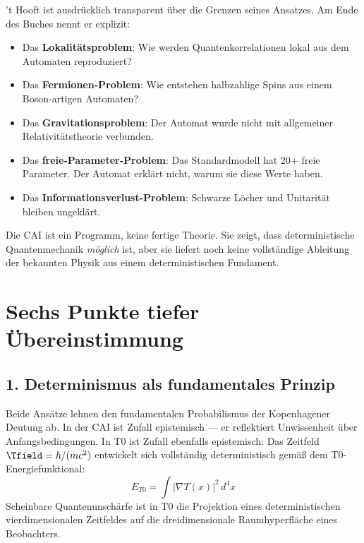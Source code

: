 't Hooft ist ausdrücklich transparent über die Grenzen seines Ansatzes. Am Ende
des Buches nennt er explizit:
\begin{itemize}
    \item Das \textbf{Lokalitätsproblem}: Wie werden Quantenkorrelationen lokal
    aus dem Automaten reproduziert?
    \item Das \textbf{Fermionen-Problem}: Wie entstehen halbzahlige Spins aus
    einem Boson-artigen Automaten?
    \item Das \textbf{Gravitationsproblem}: Der Automat wurde nicht mit
    allgemeiner Relativitätstheorie verbunden.
    \item Das \textbf{freie-Parameter-Problem}: Das Standardmodell hat 20+
    freie Parameter. Der Automat erklärt nicht, warum sie diese Werte haben.
    \item Das \textbf{Informationsverlust-Problem}: Schwarze Löcher und
    Unitarität bleiben ungeklärt.
\end{itemize}

\begin{keyresult}
    Die CAI ist ein Programm, keine fertige Theorie. Sie zeigt, dass deterministische
    Quantenmechanik \emph{möglich} ist, aber sie liefert noch keine vollständige
    Ableitung der bekannten Physik aus einem deterministischen Fundament.
\end{keyresult}

\clearpage

\section{Sechs Punkte tiefer Übereinstimmung}
\label{sec:agreement}

\subsection{1. Determinismus als fundamentales Prinzip}

Beide Ansätze lehnen den fundamentalen Probabilismus der Kopenhagener Deutung ab.
In der CAI ist Zufall epistemisch — er reflektiert Unwissenheit über
Anfangsbedingungen. In T0 ist Zufall ebenfalls epistemisch: Das Zeitfeld
$\Tfield = \hbar / (mc^2)$ entwickelt sich vollständig deterministisch gemäß dem
T0-Energiefunktional:
\begin{equation}
    E_{T0} = \int |\nabla T(x)|^2 \, d^4x
    \label{eq:t0_energy}
\end{equation}
Scheinbare Quantenunschärfe ist in T0 die Projektion eines deterministischen
vierdimensionalen Zeitfeldes auf die dreidimensionale Raumhyperfläche eines
Beobachters.

